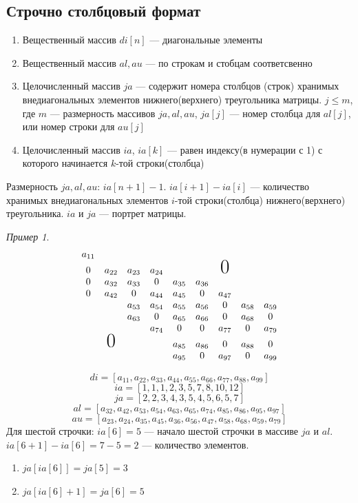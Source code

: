\documentclass[oneside]{book}
\theoremstyle{plain}
\theoremstyle{remark}
\newtheorem*{examp}{Пример}
\theoremstyle{definition}
\begin{document}
\subsection{Строчно столбцовый формат}
\label{sec:org799db20}
\begin{enumerate}
\item Вещественный массив \(di[n]\) --- диагональные элементы
\item Вещественный массив \(al, au\) --- по строкам и стобцам соответсвенно
\item Целочисленный массив \(ja\) --- содержит номера столбцов (строк)
хранимых внедиагональных элементов нижнего(верхнего) треугольника
матрицы. \(j \le m\), где \(m\) --- размерность массивов \(ja, al, au\), \(ja[j]\) --- номер столбца для \(al[j]\), или номер строки для \(au[j]\)
\item Целочисленный массив \(ia\), \(ia[k]\) --- равен индексу(в нумерации с 1) с которого начинается \(k\)-той строки(столбца)
\end{enumerate}
Размерность \(ja, al, au\): \(ia[n + 1] - 1\). \(ia[i + 1] - ia[i]\) --- количество хранимых внедиагональных элементов \(i\)-той строки(столбца) нижнего(верхнего) треугольника. \(ia\) и \(ja\) --- портрет матрицы.

\begin{examp}
\-
\[ \begin{matrix}
a_{11} & & & & & & & & \\
0 & a_{22} & a_{23} & a_{24} & & &  \text{\huge0}& &  \\
0 & a_{32} & a_{33} & 0 & a_{35} & a_{36} & & &  \\
0 & a_{42} & 0 & a_{44} & a_{45} & 0 & a_{47} & &  \\
& & a_{53} & a_{54} & a_{55} & a_{56} & 0 & a_{58} & a_{59} \\
& & a_{63} & 0 & a_{65} & a_{66} & 0 & a_{68} & 0 \\
& & & a_{74} & 0 & 0 & a_{77} & 0 & a_{79} \\
& \text{\huge0}& &  & a_{85} & a_{86} & 0 & a_{88} & 0 \\
& & &  & a_{95} & 0 & a_{97} & 0 & a_{99}
\end{matrix} \]

\[ di = [a_{11}, a_{22}, a_{33}, a_{44}, a_{55}, a_{66}, a_{77}, a_{88}, a_{99}] \]
\[ ia = [1, 1, 1, 2, 3, 5, 7, 8, 10, 12] \]
\[ ja = [2, 2, 3, 4, 3, 5, 4, 5, 6, 5, 7] \]
\[ al = [a_{32}, a_{42}, a_{53}, a_{54}, a_{63}, a_{65}, a_{74}, a_{85}, a_{86}, a_{95}, a_{97}] \]
\[ au = [a_{23}, a_{24}, a_{35}, a_{45}, a_{36}, a_{56}, a_{47}, a_{58}, a_{68}, a_{59}, a_{79}] \]
Для шестой строчки: \(ia[6] = 5\) --- начало шестой строчки в массиве \(ja\) и \(al\). \(ia[6 + 1] - ia[6] = 7 - 5 = 2\) --- количество элементов.
\begin{enumerate}
\item \(ja[ia[6]] = ja[5] = 3\)
\item \(ja[ia[6] + 1] = ja[6] = 5\)
\end{enumerate}
\end{examp}
\end{document}
